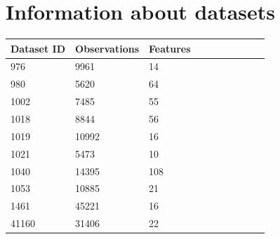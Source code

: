 \documentclass[11pt]{article}
\begin{document}
\section{Information about datasets}

\center
\begin{tabular}{llllllllll}
\toprule
Dataset ID & Observations & Features \\
\midrule
976 & 9961 & 14 \\
980 & 5620 & 64 \\
1002 & 7485 & 55 \\
1018 & 8844 & 56 \\
1019 & 10992 & 16 \\
1021 & 5473 & 10 \\
1040 & 14395 & 108 \\
1053 & 10885 & 21 \\
1461 & 45221 & 16 \\
41160 & 31406 & 22 \\
\bottomrule
\end{tabular}

\end{document}
